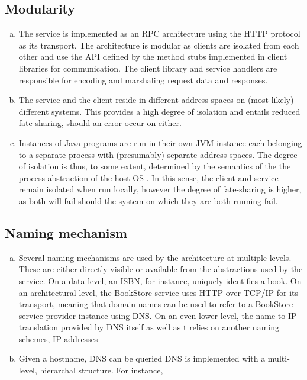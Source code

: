\subsection{Modularity}
\begin{enumerate}[(a)]
\item{The service is implemented as an RPC architecture using the HTTP protocol as its transport. The architecture is modular as clients are isolated from each other and use the API defined by the method stubs implemented in client libraries for communication. The client library and service handlers are responsible for encoding and marshaling request data and responses.}

\item{The service and the client reside in different address spaces on (most likely) different systems. This provides a high degree of isolation and entails reduced fate-sharing, should an error occur on either.}

\item{Instances of Java programs are run in their own JVM instance each belonging to a separate process with (presumably) separate address spaces. The degree of isolation is thus, to some extent, determined by the semantics of the the process abstraction of the host OS . In this sense, the client and service remain isolated when run locally, however the degree of fate-sharing is higher, as both will fail should the system on which they are both running fail.}
\end{enumerate}

\subsection{Naming mechanism}
\begin{enumerate}[(a)]
\item{Several naming mechanisms are used by the architecture at multiple levels. These are either directly visible or available from the abstractions used by the service. On a data-level, an ISBN, for instance, uniquely identifies a book. On an architectural level, the BookStore service uses HTTP over TCP/IP for its transport, meaning that domain names can be used to refer to a BookStore service provider instance using DNS. On an even lower level, the name-to-IP translation provided by DNS itself as well as t relies on another naming schemes,  IP addresses}

\item{Given a hostname, DNS can be queried DNS is implemented with a multi-level, hierarchal structure. For instance, }
\end{enumerate}